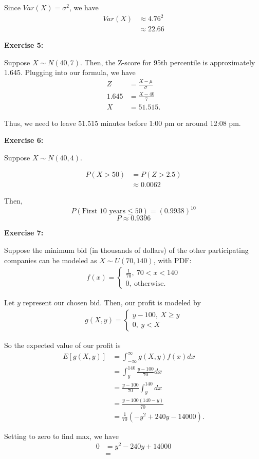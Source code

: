 \documentclass[12pt]{article}
\begin{document}
Since $Var(X) = \sigma^2$, we have
\begin{align*}
    Var(X) & \approx 4.76^2 \\
           & \approx 22.66
\end{align*}

\noindent{}\textbf{Exercise 5:}

Suppose $X \sim N(40,7)$.
Then, the Z-score for 95th percentile is approximately 1.645.
Plugging into our formula, we have
\begin{align*}
    Z     & = \frac{X - \mu}{\sigma} \\
    1.645 & = \frac{X-40}{7}         \\
    X     & = 51.515.
\end{align*}

Thus, we need to leave 51.515 minutes before 1:00 pm or around 12:08 pm.

\noindent{}\textbf{Exercise 6:}

Suppose $X \sim N(40,4)$.

\begin{align*}
    P(X > 50) & = P(Z > 2.5)   \\
              & \approx 0.0062
\end{align*}

Then,
$$P(\text{First 10 years} \le 50) = (0.9938)^{10}$$
$$P \approx 0.9396$$

\noindent{}\textbf{Exercise 7:}

Suppose the minimum bid (in thousands of dollars) of the other participating companies can be modeled as
$X \sim U(70, 140)$, with PDF:
\begin{align*}
    f(x) = \begin{cases}
               \frac{1}{70}, ~ 70 < x < 140 \\
               0, ~ \text{otherwise.}
           \end{cases}
\end{align*}

Let $y$ represent our chosen bid. Then, our profit is modeled by
\begin{align*}
    g(X,y) = \begin{cases}
                 y - 100, ~ X \geq y \\
                 0, ~ y < X
             \end{cases}
\end{align*}

So the expected value of our profit is
\begin{align*}
    E[g(X, y)] & = \int_{-\infty}^{\infty} g(X,y) f(x) dx \\
               & = \int_{y}^{140} \frac{y-100}{70}dx      \\
               & = \frac{y-100}{70} \int_{y}^{140} dx     \\
               & = \frac{y-100(140-y)}{70}                \\
               & = \frac{1}{70} (-y^2+240y-14000).
\end{align*}

Setting to zero to find max, we have
\begin{align*}
    0 & = y^2-240y+14000 \\
      & =
\end{align*}
\end{document}

